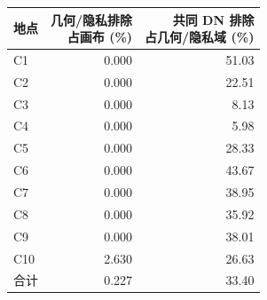 \begin{tabular*}{\textwidth}{@{\extracolsep{\fill}}lrr@{}}
\toprule
地点 & \shortstack{几何/隐私排除\\占画布 (\%)} & \shortstack{共同 DN 排除\\占几何/隐私域 (\%)} \\
\midrule
C1 & 0.000 & 51.03 \\
C2 & 0.000 & 22.51 \\
C3 & 0.000 & 8.13 \\
C4 & 0.000 & 5.98 \\
C5 & 0.000 & 28.33 \\
C6 & 0.000 & 43.67 \\
C7 & 0.000 & 38.95 \\
C8 & 0.000 & 35.92 \\
C9 & 0.000 & 38.01 \\
C10 & 2.630 & 26.63 \\
\midrule
合计 & 0.227 & 33.40 \\
\bottomrule
\end{tabular*}
